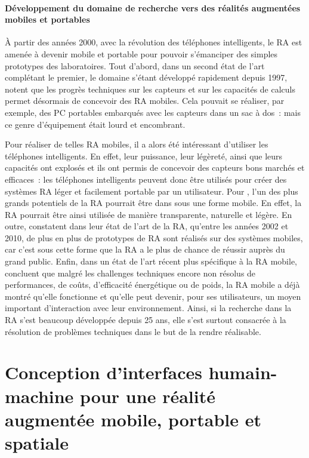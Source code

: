 \paragraph*{Développement du domaine de recherche vers des réalités augmentées mobiles et portables}
À partir des années 2000, avec la révolution des téléphones intelligents, le RA est amenée à devenir mobile et portable pour pouvoir s'émanciper des simples prototypes des laboratoires. Tout d'abord, dans un second état de l'art complétant le premier, le domaine s'étant développé rapidement depuis 1997, \citet{AzumaBaillotBehringerEtAl2001} notent que les progrès techniques sur les capteurs et sur les capacités de calculs permet désormais de concevoir des RA mobiles. Cela pouvait se réaliser, par exemple, des PC portables embarqués avec les capteurs dans un sac à dos~: mais ce genre d'équipement était lourd et encombrant. \citep{DeSaChurchill2013}

Pour réaliser de telles RA mobiles, il a alors été intéressant d'utiliser les téléphones intelligents. En effet, leur puissance, leur légèreté, ainsi que leurs capacités ont explosés et ils ont permis de concevoir des capteurs bons marchés et efficaces~: les téléphones intelligents peuvent donc être utilisés pour créer des systèmes RA léger et facilement portable par un utilisateur. \citep{ZhouDuhBillinghurst2008} \citep{DeSaChurchill2013} Pour \citet{VanKrevelenPoelman2010}, l'un des plus grands potentiels de la RA pourrait être dans sous une forme mobile. En effet, la RA pourrait être ainsi utilisée de manière transparente, naturelle et légère. En outre, \citet{CarmignianiFurhtAnisettiEtAl2011} constatent dans leur état de l'art de la RA, qu'entre les années 2002 et 2010, de plus en plus de prototypes de RA sont réalisés sur des systèmes mobiles, car c'est sous cette forme que la RA a le plus de chance de réussir auprès du grand public. Enfin, dans un état de l'art récent plus spécifique à la RA mobile, \citet{HuangHuiPeyloEtAl2013} concluent que malgré les challenges techniques encore non résolus de performances, de coûts, d'efficacité énergétique ou de poids, la RA mobile a déjà montré qu'elle fonctionne et qu'elle peut devenir, pour ses utilisateurs, un moyen important d’interaction avec leur environnement. Ainsi, si la recherche dans la RA s'est beaucoup développée depuis 25 ans, elle s'est surtout consacrée à la résolution de problèmes techniques dans le but de la rendre réalisable.



\section*{Conception d'interfaces humain-machine pour une réalité augmentée mobile, portable et spatiale}
